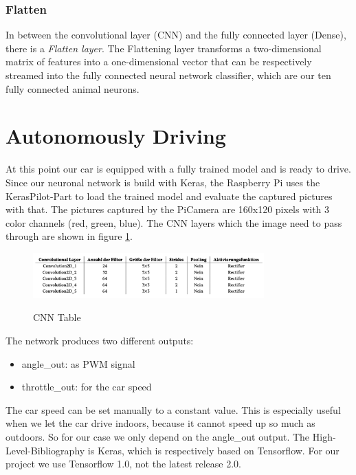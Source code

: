 \documentclass[journal]{IEEEtran}
\begin{document}
\subsubsection{Flatten}
In between the convolutional layer (CNN) and the fully connected layer (Dense), there is a \textit{Flatten layer}. The Flattening layer transforms a two-dimensional matrix of features into a one-dimensional vector that can be respectively streamed into the fully connected neural network classifier, which are our ten fully connected animal neurons. \\


\section{Autonomously Driving}
\label{sec:AutonomouslyDriving}

At this point our car is equipped with a fully trained model and is ready to drive. Since our neuronal network is build with Keras, the Raspberry Pi uses the KerasPilot-Part to load the trained model and evaluate the captured pictures with that. The pictures captured by the PiCamera are 160x120 pixels with 3 color channels (red, green, blue). The CNN layers which the image need to pass through are shown in figure \ref{cnn_table}.

\begin{figure}
  \begin{center}
  \includegraphics[width=3.5in]{photo/cnn_table.png}\\
  \caption{CNN Table}\label{cnn_table}
  \end{center}
\end{figure}

The network produces two different outputs:

\begin{itemize}
\item angle\_out: as PWM signal
\item throttle\_out: for the car speed
\end{itemize}

The car speed can be set manually to a constant value. This is especially useful when we let the car drive indoors, because it cannot speed up so much as outdoors. So for our case we only depend on the angle\_out output. The High-Level-Bibliography is Keras, which is respectively based on Tensorflow. For our project we use Tensorflow 1.0, not the latest release 2.0. \\
\end{document}
